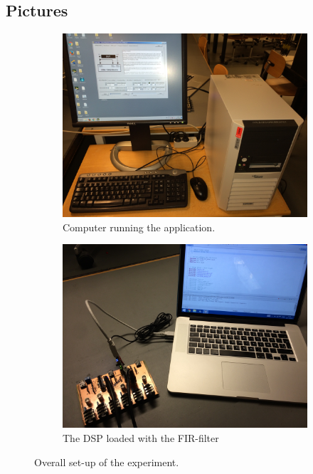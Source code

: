 \subsection{Pictures}
\begin{figure}[H]
	\centering
	\begin{subfigure}[b]{.495\textwidth}
		\centering
		\includegraphics[width=\textwidth]{../Journal/Experiments/Figures/Fullsetup1}
		\caption{Computer running the application.}
		\label{fig:FIRFullSetup1}
	\end{subfigure} 
	\begin{subfigure}[b]{.495\textwidth}
		\centering
		\includegraphics[width=\textwidth]{../Journal/Experiments/Figures/Fullsetup2}
		\caption{The DSP loaded with the FIR-filter}
		\label{fig:AngOgIndMicplace}
		\label{fig:FIRFullSetup2}
	\end{subfigure}
	\caption{Overall set-up of the experiment.}
		\label{fig:FIRFullSetup}
\end{figure}


